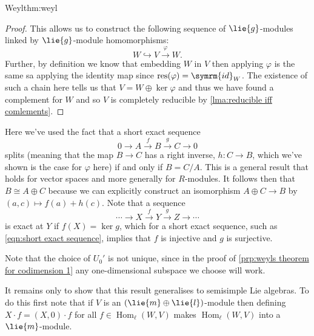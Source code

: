 \documentclass[fleqn]{NotesClass}
\DeclareMathOperator{\Hom}{Hom}
\newcommand{\isomorphic}{\cong}
\newcommand{\id}{\symrm{id}}
\DeclareMathOperator{\res}{res}
\begin{document}
\begin{thm}{Weyl}{thm:weyl}
\begin{proof}
            This allows us to construct the following sequence of \(\lie{g}\)-modules linked by \(\lie{g}\)-module homomorphisms:
            \begin{equation}
                W \hookrightarrow V \xrightarrow{\varphi} W.
            \end{equation}
            Further, by definition we know that embedding \(W\) in \(V\) then applying \(\varphi\) is the same sa applying the identity map since \(\res(\varphi) = \id_W\).
            The existence of such a chain here tells us that \(V = W \oplus \ker \varphi\) and thus we have found a complement for \(W\) and so \(V\) is completely reducible by \cref{lma:reducible iff comlements}.
        \end{proof}
    \end{thm}
    
    Here we've used the fact that a short exact sequence
    \begin{equation}
        \label{eqn:short exact sequence}
        0 \to A \xrightarrow{f} B \xrightarrow{g} C \to 0
    \end{equation}
    splits (meaning that the map \(B \to C\) has a right inverse, \(h \colon C \to B\), which we've shown is the case for \(\varphi\) here) if and only if \(B = C/A\).
    This is a general result that holds for vector spaces and more generally for \(R\)-modules.
    It follows then that \(B \isomorphic A \oplus C\) because we can explicitly construct an isomorphism \(A \oplus C \to B\) by \((a, c) \mapsto f(a) + h(c)\).
    Note that a sequence
    \begin{equation}
        \dotsb \to X \xrightarrow{f} Y \xrightarrow{g} Z \to \dotsb
    \end{equation}
    is exact at \(Y\) if \(f(X) = \ker g\), which for a short exact sequence, such as \cref{eqn:short exact sequence}, implies that \(f\) is injective and \(g\) is surjective.
    
    Note that the choice of \(U_0'\) is not unique, since in the proof of \cref{prp:weyls theorem for codimension 1} any one-dimensional subspace we choose will work.
    
    It remains only to show that this result generalises to semisimple Lie algebras.
    To do this first note that if \(V\) is an \((\lie{m} \oplus \lie{l})\)-module then defining \(X \cdot f = (X, 0) \cdot f\) for all \(f \in \Hom_{\ell}(W, V)\) makes \(\Hom_{\ell}(W, V)\) into a \(\lie{m}\)-module.
    
\end{document}
